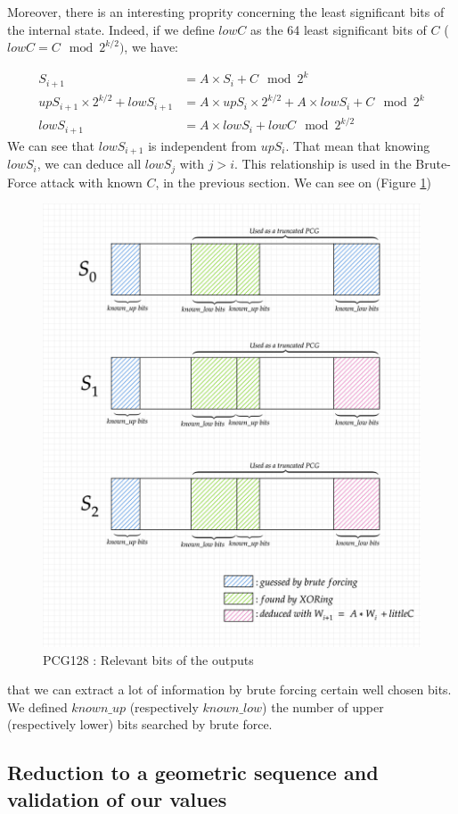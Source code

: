 \documentclass[preprint]{iacrtrans}
\begin{document}
Moreover, there is an interesting proprity concerning the least significant bits of the internal state. Indeed, if we define $lowC$ as the 64 least significant bits of $C$ ($lowC = C \mod{2^{k/2}})$, we have:

\begin{align}
    S_{i+1} &= A \times S_i + C \mod{2^k}\\
    upS_{i+1} \times 2^{k/2} + lowS_{i+1} &= A \times upS_i \times 2^{k/2} + A \times lowS_i + C \mod{2^k} \\
    lowS_{i+1} &= A \times lowS_i + lowC \mod 2^{k/2}
\end{align}
We can see that $lowS_{i+1}$ is independent from $upS_i$. That mean that knowing $lowS_i$, we can deduce all $lowS_j$ with $j>i$. This relationship is used in the Brute-Force attack with known $C$, in the previous section.
We can see on (Figure \ref{pcg128goodbits})%
\begin{figure}[h!]
    \centering
    \includegraphics[width=0.70\linewidth]{pictures/deducingPCG128.png}
    \caption{PCG128 : Relevant bits of the outputs}
    \label{pcg128goodbits}
\end{figure}
that we can extract a lot of information by brute forcing certain well chosen bits. We defined $known\_up$ (respectively $known\_low$) the number of upper (respectively lower) bits searched by brute force.


\subsection{Reduction to a geometric sequence and validation of our values}
\end{document}
